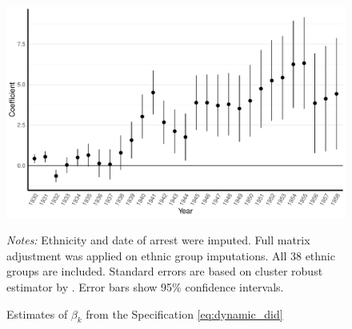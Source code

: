 \begin{figure}[h]
\centering
\caption{Estimates of $\beta_k$ from the Specification \ref{eq:dynamic_did}}
\includegraphics[width=\textwidth]{plots/effects/ethnicity_imputation/annual/point_range_robust_cr2_date_imp_full_years.pdf}
\begin{minipage}{0.92\textwidth}
\footnotesize
\emph{Notes:} Ethnicity and date of arrest were imputed.  Full matrix adjustment was applied on ethnic group imputations. All 38 ethnic groups are included.  Standard errors are based on cluster robust estimator by \citet{pustejovsky_small-sample_2018}. Error bars show 95\% confidence intervals. 
\end{minipage}
\label{fig:did_effets}
\end{figure}



